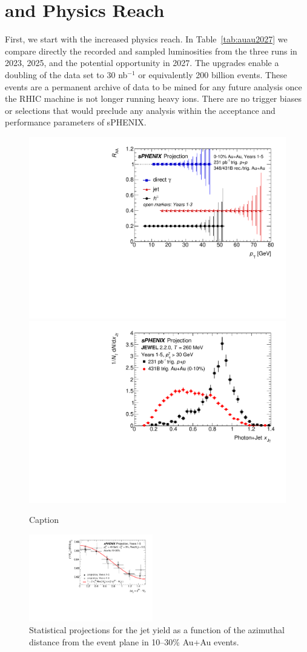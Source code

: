 \section{\auau and \pp Physics Reach}

First, we start with the \auau increased physics reach.    In Table~\ref{tab:auau2027} we compare directly the \auau recorded and sampled luminosities from the three runs in 2023, 2025, and the potential opportunity in 2027.   The upgrades enable a doubling of the \auau data set to 30 nb$^{-1}$ or equivalently 200 billion \auau events.    These events are a permanent archive of \auau data to be mined for any future analysis once the RHIC machine is not longer running heavy ions.    There are no trigger biases or selections that would preclude any analysis within the acceptance and performance parameters of sPHENIX.

\begin{figure}
    \centering
    \includegraphics[width=0.48\linewidth]{figs/RAA_jet_2}
    \includegraphics[width=0.48\linewidth]{figs/xJg_2}
    \caption{Caption}
    \label{fig:RAA_jet_extrayears}
\end{figure}

\begin{figure}[h]
\centering
\includegraphics[width=0.48\textwidth]{figs/jet_dphi_2}
\caption{Statistical projections for the jet yield as a function of the azimuthal distance from the event plane in 10--30\% Au+Au events.}
\label{fig:jet_dphi_proj}
\end{figure}

